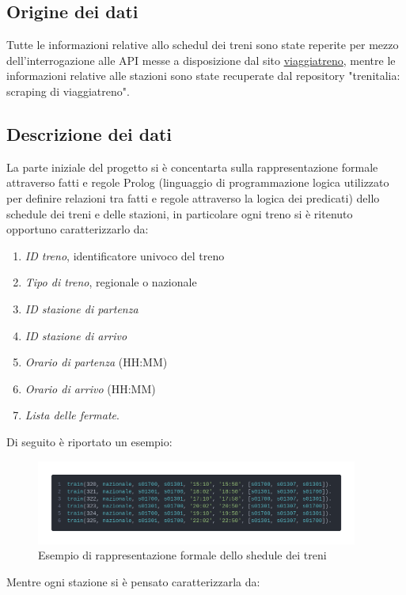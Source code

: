 \documentclass[italian,12pt,a4paper]{article}
\begin{document}
	\subsection{Origine dei dati}
	Tutte le informazioni relative allo schedul dei treni sono state reperite per mezzo dell'interrogazione alle API messe a disposizione dal sito \href{http://www.viaggiatreno.it/infomobilita/index.jsp}{viaggiatreno}, mentre le informazioni relative alle stazioni sono state recuperate dal repository "trenitalia: scraping di viaggiatreno".\cite{dati_stazioni}
	
	\subsection{Descrizione dei dati}
	La parte iniziale del progetto si è concentarta sulla rappresentazione formale attraverso fatti e regole Prolog (linguaggio di programmazione logica utilizzato per definire relazioni tra fatti e regole attraverso la logica dei predicati) dello schedule dei treni e delle stazioni, in particolare ogni treno si è ritenuto opportuno caratterizzarlo da:
	
		\begin{enumerate}
			\item \textit{ID treno}, identificatore univoco del treno
			\item \textit{Tipo di treno}, regionale o nazionale
			\item \textit{ID stazione di partenza}
			\item \textit{ID stazione di arrivo}
			\item\textit{Orario di partenza} (HH:MM)
			\item \textit{Orario di arrivo} (HH:MM)
			\item \textit{Lista delle fermate}.
		\end{enumerate} 
		\vspace{20px}
		Di seguito è riportato un esempio:
		
		\begin{figure}[!h]
			\centering
			\includegraphics[width=400px]{img/code_prolog1}
			\caption{Esempio di rappresentazione formale dello shedule dei treni}
		\end{figure}
		\newpage
	Mentre ogni stazione si è pensato caratterizzarla da:
	
\end{document}
